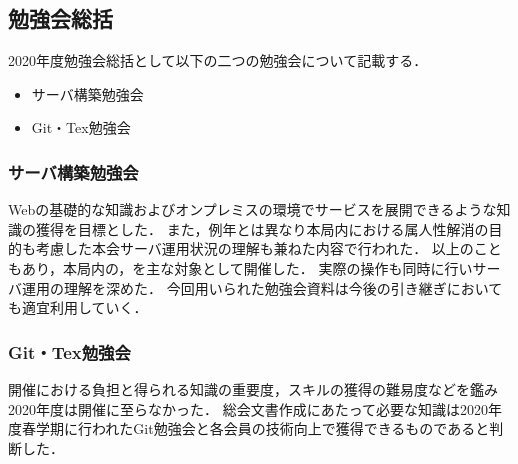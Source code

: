 \subsection*{勉強会総括}


2020年度勉強会総括として以下の二つの勉強会について記載する．
\begin{itemize}
    \item サーバ構築勉強会
    \item Git・Tex勉強会
\end{itemize}

\subsubsection*{サーバ構築勉強会}
Webの基礎的な知識およびオンプレミスの環境でサービスを展開できるような知識の獲得を目標とした．
また，例年とは異なり本局内における属人性解消の目的も考慮した本会サーバ運用状況の理解も兼ねた内容で行われた．
以上のこともあり，本局内の\firstGrade{}，\secondGrade{}を主な対象として開催した．
実際の操作も同時に行いサーバ運用の理解を深めた．
今回用いられた勉強会資料は今後の引き継ぎにおいても適宜利用していく．

\subsubsection*{Git・Tex勉強会}
開催における負担と得られる知識の重要度，スキルの獲得の難易度などを鑑み2020年度は開催に至らなかった．
総会文書作成にあたって必要な知識は2020年度春学期に行われたGit勉強会と各会員の技術向上で獲得できるものであると判断した．
